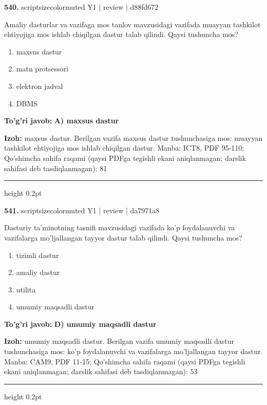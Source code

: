 \documentclass[10pt,a4paper]{article}
\begin{document}
{\bfseries\sffamily\color{ink} 540.} {scriptsizecolor{muted} Y1 | review | d88fd672}
\par
Amaliy dasturlar va vazifaga mos tanlov mavzusidagi vazifada muayyan tashkilot ehtiyojiga mos ishlab chiqilgan dastur talab qilindi. Qaysi tushuncha mos?
\begin{enumerate}[label=\Alph*),leftmargin=9mm]
\item maxsus dastur
\item matn protsessori
\item elektron jadval
\item DBMS
\end{enumerate}
\begin{tcolorbox}[enhanced,breakable,colback=teal!4,colframe=teal!60!black,boxrule=0.45pt,arc=1.2mm,left=2.7mm,right=2.7mm,top=1.8mm,bottom=1.8mm,before skip=2mm,after skip=2mm]
{\bfseries\sffamily\color{teal}To'g'ri javob:} \textbf{A) maxsus dastur}
\par\smallskip
{\bfseries Izoh:} maxsus dastur. Berilgan vazifa maxsus dastur tushunchasiga mos: muayyan tashkilot ehtiyojiga mos ishlab chiqilgan dastur. Manba: ICT8, PDF 95-110; Qo'shimcha sahifa raqami (qaysi PDFga tegishli ekani aniqlanmagan; darslik sahifasi deb tasdiqlanmagan): 81
\end{tcolorbox}
\vspace{2mm}\hrule height 0.2pt\vspace{3mm}

{\bfseries\sffamily\color{ink} 541.} {scriptsizecolor{muted} Y1 | review | da7971a8}
\par
Dasturiy ta'minotning tasnifi mavzusidagi vazifada ko'p foydalanuvchi va vazifalarga mo'ljallangan tayyor dastur talab qilindi. Qaysi tushuncha mos?
\begin{enumerate}[label=\Alph*),leftmargin=9mm]
\item tizimli dastur
\item amaliy dastur
\item utilita
\item umumiy maqsadli dastur
\end{enumerate}
\begin{tcolorbox}[enhanced,breakable,colback=teal!4,colframe=teal!60!black,boxrule=0.45pt,arc=1.2mm,left=2.7mm,right=2.7mm,top=1.8mm,bottom=1.8mm,before skip=2mm,after skip=2mm]
{\bfseries\sffamily\color{teal}To'g'ri javob:} \textbf{D) umumiy maqsadli dastur}
\par\smallskip
{\bfseries Izoh:} umumiy maqsadli dastur. Berilgan vazifa umumiy maqsadli dastur tushunchasiga mos: ko'p foydalanuvchi va vazifalarga mo'ljallangan tayyor dastur. Manba: CAM9, PDF 11-15; Qo'shimcha sahifa raqami (qaysi PDFga tegishli ekani aniqlanmagan; darslik sahifasi deb tasdiqlanmagan): 53
\end{tcolorbox}
\vspace{2mm}\hrule height 0.2pt\vspace{3mm}
\end{document}
